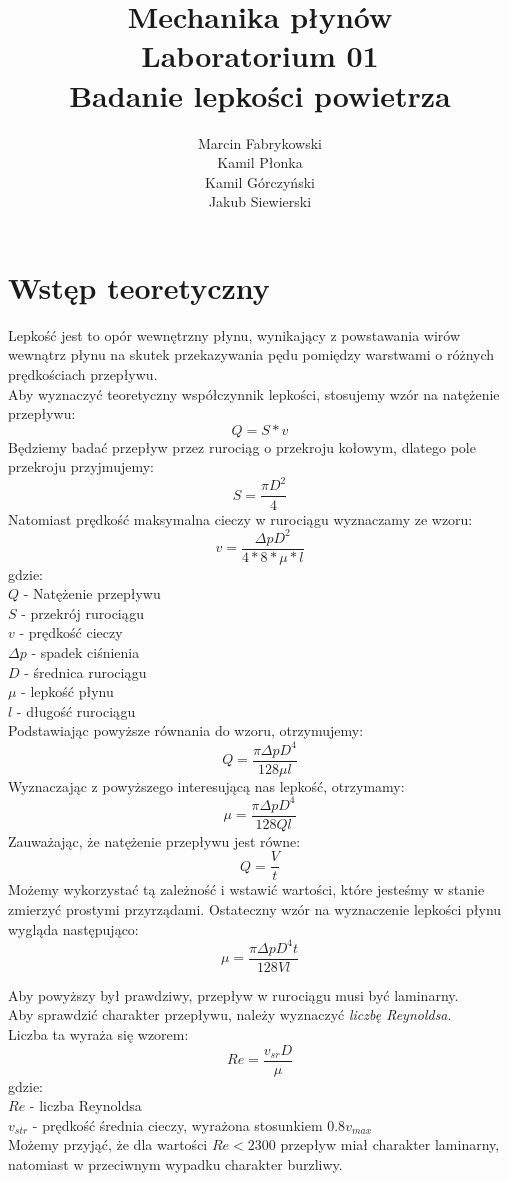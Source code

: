 \documentclass[a4paper,12pt]{article}
\title{Mechanika płynów\\
Laboratorium 01\\
Badanie lepkości powietrza}
\author{Marcin Fabrykowski\\Kamil Płonka\\Kamil Górczyński\\Jakub Siewierski}
\begin{document}
\maketitle
\newpage
\section{Wstęp teoretyczny}
Lepkość jest to opór wewnętrzny płynu, wynikający z powstawania wirów wewnątrz płynu na skutek przekazywania pędu pomiędzy warstwami o różnych prędkościach przepływu.\\
Aby wyznaczyć teoretyczny współczynnik lepkości, stosujemy wzór na natężenie przepływu:
$$Q=S*v$$
Będziemy badać przepływ przez rurociąg o przekroju kołowym, dlatego pole przekroju przyjmujemy:
$$S=\dfrac{\pi D^2}{4}$$
Natomiast prędkość maksymalna cieczy w rurociągu wyznaczamy ze wzoru:
$$v=\dfrac{\Delta pD^2}{4*8*\mu*l}$$
gdzie:\\
$ Q$ - Natężenie przepływu\\
$ S$ - przekrój rurociągu\\
$ v$ - prędkość cieczy\\
$\Delta p $ - spadek ciśnienia\\
$ D$ - średnica rurociągu\\
$ \mu$ - lepkość płynu\\
$ l$ - długość rurociągu\\
Podstawiając powyższe równania do wzoru, otrzymujemy:
$$Q=\dfrac{\pi\Delta pD^4}{128\mu l}$$
Wyznaczając z powyższego interesującą nas lepkość, otrzymamy:
$$\mu=\dfrac{\pi\Delta pD^4}{128Ql}$$
Zauważając, że natężenie przepływu jest równe:
$$Q=\dfrac{V}{t}$$
Możemy wykorzystać tą zależność i wstawić wartości, które jesteśmy w stanie zmierzyć prostymi przyrządami. Ostateczny wzór na wyznaczenie lepkości płynu wygląda następująco:
$$\mu=\dfrac{\pi\Delta pD^4t}{128Vl}$$

Aby powyższy był prawdziwy, przepływ w rurociągu musi być laminarny.\\
Aby sprawdzić charakter przepływu, należy wyznaczyć \textit{liczbę Reynoldsa}.\\
Liczba ta wyraża się wzorem:
$$Re=\dfrac{v_{sr}D}{\mu}$$
gdzie:\\
$Re$ - liczba Reynoldsa\\
$v_{str}$ - prędkość średnia cieczy, wyrażona stosunkiem $0.8v_{max}$\\

Możemy przyjąć, że dla wartości $Re<2300$ przepływ miał charakter laminarny, natomiast w przeciwnym wypadku charakter burzliwy.
\end{document}
